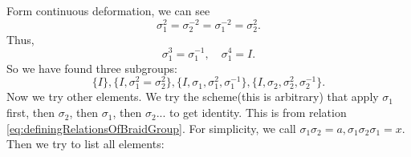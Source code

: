 \documentclass{book}
\begin{document}
\begin{figure}[h!]
\label{fig:}
\end{figure}

Form continuous deformation, we can see
\begin{equation*}
\sigma _{1}^{2} =\sigma _{2}^{-2} =\sigma _{1}^{-2} =\sigma _{2}^{2} .
\end{equation*}
Thus,
\begin{equation*}
\sigma _{1}^{3} =\sigma _{1}^{-1} ,\quad \sigma _{1}^{4} =I.
\end{equation*}
So we have found three subgroups:
\begin{equation*}
\{I\},\{I,\sigma _{1}^{2} =\sigma _{2}^{2} \},\{I,\sigma _{1} ,\sigma _{1}^{2} ,\sigma _{1}^{-1} \},\{I,\sigma _{2} ,\sigma _{2}^{2} ,\sigma _{2}^{-1} \}.
\end{equation*}
Now we try other elements. We try the scheme(this is arbitrary) that apply $\sigma _{1}$ first, then $\sigma _{2}$, then $\sigma _{1}$, then $\sigma _{2}$... to get identity. This is from relation \eqref{eq:definingRelationsOfBraidGroup}. For simplicity, we call $\sigma _{1} \sigma _{2} =a,\sigma _{1} \sigma _{2} \sigma _{1} =x$. Then we try to list all elements:
\end{document}
